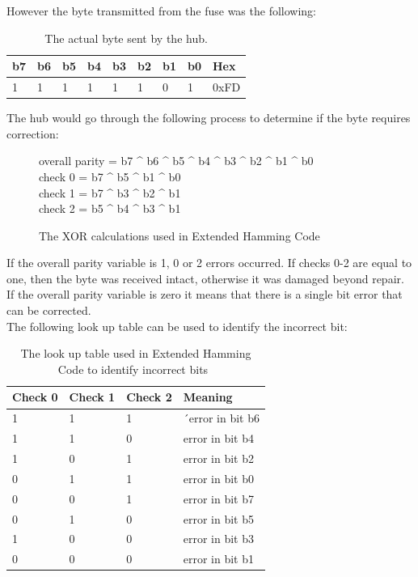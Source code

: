 \documentclass[preprint,12pt,3p]{elsarticle}
\begin{document}
However the byte transmitted from the fuse was the following:
\begin{table}[H]
\centering
\begin{tabular}{| l | l | l | l | l | l | l | l | l |}
\hline
b7 & b6 & b5 & b4 & b3 & b2 & b1 & b0 & Hex\\ \hline
1 & 1 & 1 & 1 & 1 & 1 & 0 & 1  & 0xFD\\ \hline
\end{tabular}
\caption{The actual byte sent by the hub.}
\label{tab:correctpacket}
\end{table}

The hub would go through the following process to determine if the byte requires correction:\\
\begin{figure}[H]
\centering
overall parity = b7 \^{} b6 \^{} b5 \^{} b4 \^{} b3 \^{} b2 \^{} b1 \^{} b0\\
check 0 = b7 \^{} b5 \^{} b1 \^{} b0\\
check 1 = b7 \^{} b3 \^{} b2 \^{} b1\\
check 2 = b5 \^{} b4 \^{} b3 \^{} b1\\
\caption{The XOR calculations used in Extended Hamming Code~\cite{extendedhamming}}
\label{fig:xorcalcs}
\end{figure}

If the overall parity variable is 1, 0 or 2 errors occurred. If checks 0-2 are equal to one, then the byte was received intact, otherwise it was damaged beyond repair.\\
If the overall parity variable is zero it means that there is a single bit error that can be corrected.\\
The following look up table can be used to identify the incorrect bit:
\begin{table}[H]
\centering
\begin{tabular}{| l | l | l | l |}
\hline
Check 0 & Check 1 & Check 2 & Meaning\\ \hline
1 & 1 & 1 &´error in bit b6\\ \hline
1 & 1 & 0 & error in bit b4\\ \hline
1 & 0 & 1 & error in bit b2\\ \hline
0 & 1 & 1 & error in bit b0\\ \hline
0 & 0 & 1 & error in bit b7\\ \hline
0 & 1 & 0 & error in bit b5\\ \hline
1 & 0 & 0 & error in bit b3\\ \hline
0 & 0 & 0 & error in bit b1\\ \hline
\end{tabular}
\caption{The look up table used in Extended Hamming Code to identify incorrect bits~\cite{extendedhamming}}
\label{tab:paritylookup}
\end{table}
\end{document}
